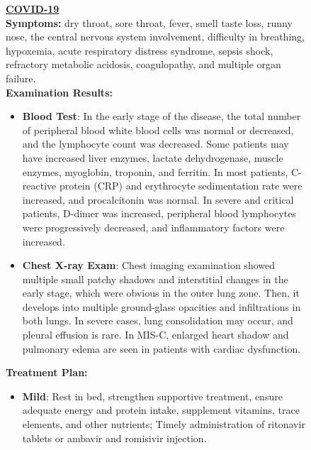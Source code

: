 \documentclass[fleqn,12pt]{wlscirep}
\begin{document}
\FloatBarrier
\begin{figure}[H]
\begin{mdframed}[innerleftmargin=10pt,innerrightmargin=10pt]
\underline{\textbf{COVID-19}} \vspace{3mm} \\
\textbf{Symptoms:} dry throat, sore throat, fever, smell taste loss, runny nose, the central nervous system involvement, difficulty in breathing, hypoxemia, acute respiratory distress syndrome, sepsis shock, refractory metabolic acidosis, coagulopathy, and multiple organ failure.\vspace{3mm}\\
\textbf{Examination Results:} 
\begin{itemize}[leftmargin=2em,    %
                itemsep=0.5em,    %
                topsep=0.5em,     %
                parsep=0pt,       %
                labelsep=0.5em]   %
      \item \textbf{Blood Test}: In the early stage of the disease, the total number of peripheral blood white blood cells was normal or decreased, and the lymphocyte count was decreased. Some patients may have increased liver enzymes, lactate dehydrogenase, muscle enzymes, myoglobin, troponin, and ferritin. In most patients, C-reactive protein (CRP) and erythrocyte sedimentation rate were increased, and procalcitonin was normal. In severe and critical patients, D-dimer was increased, peripheral blood lymphocytes were progressively decreased, and inflammatory factors were increased.
      \item \textbf{Chest X-ray Exam}: Chest imaging examination showed multiple small patchy shadows and interstitial changes in the early stage, which were obvious in the outer lung zone. Then, it develops into multiple ground-glass opacities and infiltrations in both lungs. In severe cases, lung consolidation may occur, and pleural effusion is rare. In MIS-C, enlarged heart shadow and pulmonary edema are seen in patients with cardiac dysfunction.
\end{itemize}
\vspace{3mm}
\textbf{Treatment Plan:} 
\begin{itemize}[leftmargin=2em,    %
                itemsep=0.5em,    %
                topsep=0.5em,     %
                parsep=0pt,       %
                labelsep=0.5em]   %
    \item \textbf{Mild}: Rest in bed, strengthen supportive treatment, ensure adequate energy and protein intake, supplement vitamins, trace elements, and other nutrients; Timely administration of ritonavir tablets or ambavir and romisivir injection.

\end{itemize}
\end{mdframed}
\end{figure}
\end{document}
